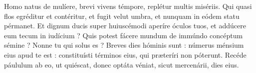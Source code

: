 
Homo natus de mulíere, brevi vivens témpore, replétur multis misériis.
Qui quasi flos egréditur et contéritur, et fugit velut umbra, et nunquam in eódem statu pérmanet.
Et dignum ducis super huiuscémodi aperíre óculos tuos, et addúcere eum tecum in iudícium ?
Quis potest fácere mundum de immúndo concéptum sémine ? Nonne tu qui solus es ?
Breves dies hóminis sunt : númerus ménsium eius apud te est : constituísti términos eius, qui præteríri non póterunt.
Recéde páululum ab eo, ut quiéscat, donec optáta véniat, sicut mercenárii, dies eius.